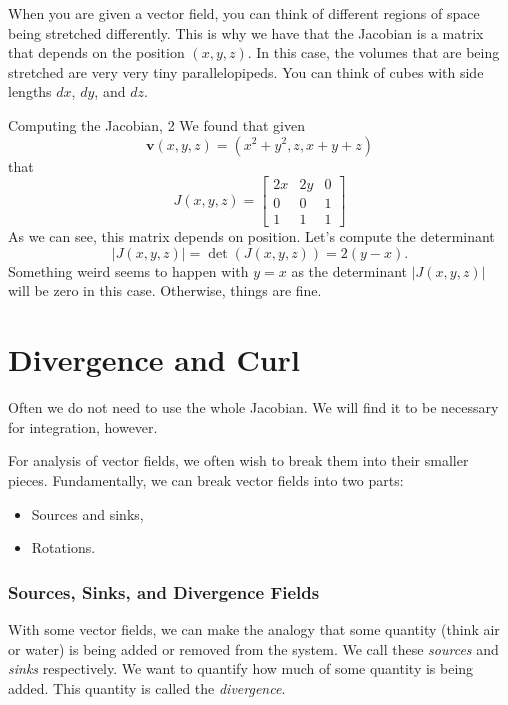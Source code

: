         When you are given a vector field, you can think of different regions of space being stretched differently.  This is why we have that the Jacobian is a matrix that depends on the position $(x,y,z)$.  In this case, the volumes that are being stretched are very very tiny parallelopipeds.  You can think of cubes with side lengths $dx$, $dy$, and $dz$. 
        
        \begin{ex}{Computing the Jacobian, 2}
        We found that given
        \[
        \mathbf{v}(x,y,z) = (x^2+y^2,z,x+y+z)
        \]
        that
        \[
        J(x,y,z) = \begin{bmatrix} 2x & 2y & 0 \\ 0 & 0 & 1 \\ 1 & 1 & 1 \end{bmatrix}
        \]
        As we can see, this matrix depends on position.  Let's compute the determinant
        \[
        |J(x,y,z)|=\det(J(x,y,z))=2(y-x). 
        \]
        Something weird seems to happen with $y=x$ as the determinant $|J(x,y,z)|$ will be zero in this case. Otherwise, things are fine.
        \end{ex}
        
        \section{Divergence and Curl}
        Often we do not need to use the whole Jacobian.  We will find it to be necessary for integration, however.  
        
        For analysis of vector fields, we often wish to break them into their smaller pieces.  Fundamentally, we can break vector fields into two parts:
        \begin{itemize}
            \item Sources and sinks,
            \item Rotations.
        \end{itemize}
        
        \subsubsection{Sources, Sinks, and Divergence Fields}
        With some vector fields, we can make the analogy that some quantity (think air or water) is being added or removed from the system.  We call these \emph{sources} and \emph{sinks} respectively.  We want to quantify how much of some quantity is being added. This quantity is called the \emph{divergence}.
        
